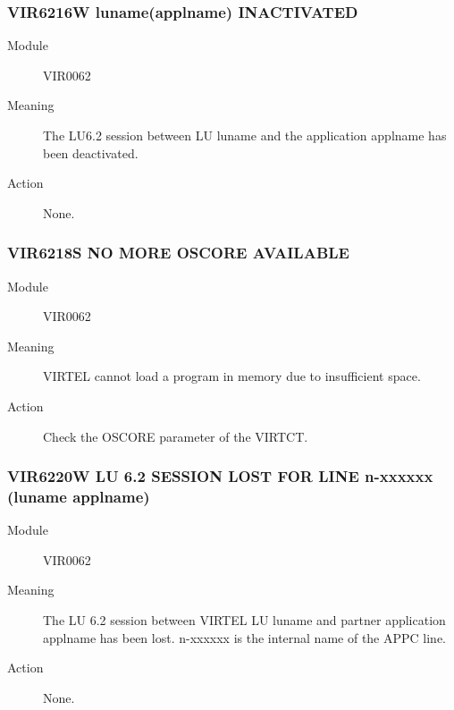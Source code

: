 \documentclass[letterpaper,10pt,english]{sphinxmanual}
\begin{document}
\subsubsection{VIR6216W luname(applname) INACTIVATED}
\label{\detokenize{messages:vir6216w-luname-applname-inactivated}}\begin{description}
\item[{Module}] \leavevmode
VIR0062

\item[{Meaning}] \leavevmode
The LU6.2 session between LU luname and the application applname has been deactivated.

\item[{Action}] \leavevmode
None.

\end{description}


\subsubsection{VIR6218S NO MORE OSCORE AVAILABLE}
\label{\detokenize{messages:vir6218s-no-more-oscore-available}}\begin{description}
\item[{Module}] \leavevmode
VIR0062

\item[{Meaning}] \leavevmode
VIRTEL cannot load a program in memory due to insufficient space.

\item[{Action}] \leavevmode
Check the OSCORE parameter of the VIRTCT.

\end{description}


\subsubsection{VIR6220W LU 6.2 SESSION LOST FOR LINE n-xxxxxx (luname \textendash{} applname)}
\label{\detokenize{messages:vir6220w-lu-6-2-session-lost-for-line-n-xxxxxx-luname-applname}}\begin{description}
\item[{Module}] \leavevmode
VIR0062

\item[{Meaning}] \leavevmode
The LU 6.2 session between VIRTEL LU luname and partner application applname has been lost. n-xxxxxx is the internal name of the APPC line.

\item[{Action}] \leavevmode
None.

\end{description}
\end{document}
